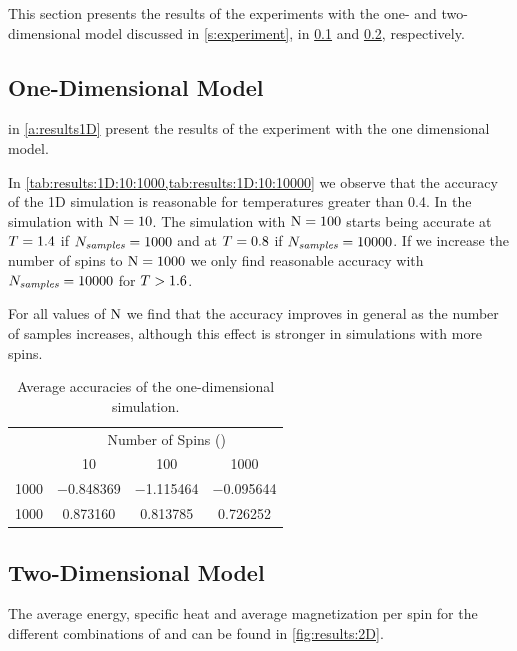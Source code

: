 This section presents the results of the experiments with the one- and two- dimensional model discussed in \cref{s:experiment}, in \cref{ss:results:1D} and \cref{ss:results:2D}, respectively.

\subsection{One-Dimensional Model}
\label{ss:results:1D}
	 in \cref{a:results1D} present the results of the experiment with the one dimensional model.

	In \cref{tab:results:1D:10:1000,tab:results:1D:10:10000} we observe that the accuracy of the 1D simulation is reasonable for temperatures greater than 0.4. In the simulation with $\mathrm{N} = 10$. 
	The simulation with $\mathrm{N} = 100$ starts being accurate at $T = 1.4$ if $N_\textit{samples} = 1000$ and at $T = 0.8$ if $N_\textit{samples} = 10000$. 
	If we increase the number of spins to $\mathrm{N} = 1000$ we only find reasonable accuracy with $N_\textit{samples} = 10000$ for $T > 1.6$.

	For all values of $\mathrm{N}$ we find that the accuracy improves in general as the number of samples increases, although this effect is stronger in simulations with more spins.

	\begin{table}
		\centering
		\caption{Average accuracies of the one-dimensional simulation.}
		\begin{tabular}{cccc}
			\toprule
			~ & \multicolumn{3}{c}{Number of Spins (\numberOfSpins)}\\ 
			\cmidrule(r){2-4}
			\numberOfSamples & 10 & 100 & 1000 \\
			 \midrule 
			 1000 & \num{-0.848369} & \num{-1.115464} & \num{-0.095644}\\
			 1000 & \num{0.873160} & \num{0.813785} & \num{0.726252}\\
			\bottomrule
		\end{tabular}
		\label{tab:results:1D:averageAccuracies}			
	\end{table}

\subsection{Two-Dimensional Model}
\label{ss:results:2D}
	The average energy, specific heat and average magnetization per spin for the different combinations of \numberOfSpins and \numberOfSamples can be found in \cref{fig:results:2D}. 

